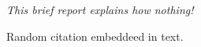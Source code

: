 \textit{This brief report explains how nothing!}

% 









Random citation \cite{the_lexer_hack} embeddeed in text.

\newpage




